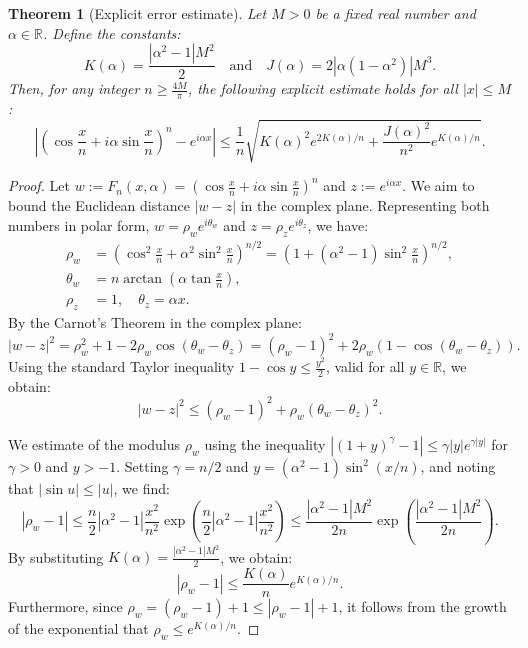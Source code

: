 \documentclass[reqno,11pt]{amsart}
\newtheorem{theorem}{Theorem}[section]
\theoremstyle{definition}
\begin{document}
\begin{theorem}[Explicit error estimate] \label{thm:carnot}
Let $M > 0$ be a fixed real number and $\alpha \in \mathbb{R}$. Define the constants:
\[
    K(\alpha) = \frac{|\alpha^2-1|M^2}{2} \quad \text{and} \quad J(\alpha) = 2|\alpha(1-\alpha^2)|M^3.
\]
Then, for any integer $n \ge \frac{4M}{\pi}$, the following explicit estimate holds for all $|x| \le M$:
\begin{equation}
    \left| \left( \cos\frac{x}{n} + i \alpha \sin\frac{x}{n} \right)^n - e^{i \alpha x} \right| \leq \frac{1}{n} \sqrt{ K(\alpha)^2 e^{2K(\alpha)/n} + \frac{J(\alpha)^2}{n^2} e^{K(\alpha)/n} }.
\end{equation}
\end{theorem}

\begin{proof}
Let $w := F_n(x, \alpha) = \left(\cos\frac{x}{n} + i\alpha \sin\frac{x}{n}\right)^n$ and $z := e^{i\alpha x}$. We aim to bound the Euclidean distance $|w-z|$ in the complex plane. Representing both numbers in polar form, $w = \rho_w e^{i\theta_w}$ and $z = \rho_z e^{i\theta_z}$, we have:
\begin{align*}
    \rho_w &= \left(\cos^2 \frac{x}{n} + \alpha^2 \sin^2 \frac{x}{n}\right)^{n/2} = \left( 1 + (\alpha^2-1)\sin^2 \frac{x}{n} \right)^{n/2}, \\
    \theta_w &= n \arctan \left(\alpha \tan \frac{x}{n}\right), \\
    \rho_z &= 1, \quad \theta_z = \alpha x.
\end{align*}
By the Carnot's Theorem in the complex plane:
\begin{equation} \label{eq:carnot_id}
    |w-z|^2 = \rho_w^2 + 1 - 2\rho_w \cos(\theta_w - \theta_z) = (\rho_w - 1)^2 + 2\rho_w(1 - \cos(\theta_w - \theta_z)).
\end{equation}
Using the standard Taylor inequality $1 - \cos y \leq \frac{y^2}{2}$, valid for all $y \in \mathbb{R}$, we obtain:
\begin{equation} \label{eq:main_ineq_proof}
    |w-z|^2 \leq (\rho_w - 1)^2 + \rho_w (\theta_w - \theta_z)^2.
\end{equation}

\medskip
We estimate of the modulus $\rho_w$
using the inequality $|(1+y)^\gamma - 1| \leq \gamma |y| e^{\gamma |y|}$ for $\gamma > 0$ and $y > -1$. Setting $\gamma = n/2$ and $y = (\alpha^2-1)\sin^2(x/n)$, and noting that $|\sin u| \le |u|$, we find:
\[
    |\rho_w - 1| \leq \frac{n}{2} |\alpha^2-1| \frac{x^2}{n^2} \exp\left( \frac{n}{2} |\alpha^2-1| \frac{x^2}{n^2} \right) \leq \frac{|\alpha^2-1|M^2}{2n} \exp\left( \frac{|\alpha^2-1|M^2}{2n} \right).
\]
By substituting $K(\alpha) = \frac{|\alpha^2-1|M^2}{2}$, we obtain:
\begin{equation} \label{eq:rho_est}
    |\rho_w - 1| \leq \frac{K(\alpha)}{n} e^{K(\alpha)/n}.
\end{equation}
Furthermore, since $\rho_w = (\rho_w - 1) + 1 \le |\rho_w - 1| + 1$, it follows from the growth of the exponential that $\rho_w \leq e^{K(\alpha)/n}$.


\end{proof}
\end{document}
